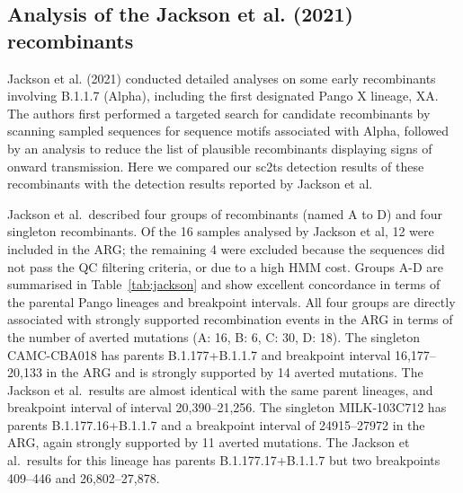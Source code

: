 \documentclass[12pt,letterpaper]{article}
\begin{document}
\subsection*{Analysis of the Jackson et al. (2021) recombinants}
Jackson et al. (2021) conducted detailed analyses on some early recombinants
involving B.1.1.7 (Alpha), including the first designated Pango X lineage, XA.
The authors first performed a targeted search for candidate recombinants by
scanning sampled sequences for sequence motifs associated with Alpha, followed
by an analysis to reduce the list of plausible recombinants displaying signs of
onward transmission. Here we compared our sc2ts detection results of these
recombinants with the detection results reported by Jackson et al.

Jackson et al.\ described four groups of recombinants (named A to D) and
four singleton recombinants.
Of the 16 samples analysed by Jackson et al, 12 were included in the ARG;
the remaining 4 were excluded because the sequences did not pass the 
QC filtering criteria, or due to a high HMM cost. Groups A-D are summarised 
in Table~\ref{tab:jackson} and show excellent concordance in terms 
of the parental Pango lineages and breakpoint intervals. All four groups
are directly associated with strongly supported recombination events 
in the ARG in terms of the number of averted mutations 
(A: 16, B: 6, C: 30, D: 18). 
The singleton CAMC-CBA018 has parents
B.1.177+B.1.1.7 and breakpoint interval 16,177--20,133 
in the ARG 
and is strongly supported by 14 averted mutations.
The Jackson et al.\ results are almost identical with the same parent 
lineages, and breakpoint interval of interval 20,390--21,256.
The singleton MILK-103C712 
has parents B.1.177.16+B.1.1.7 and a breakpoint interval of 
24915--27972 
in the ARG, again strongly supported by 11 averted mutations.
The Jackson et al.\ results for this lineage 
has parents B.1.177.17+B.1.1.7 but two breakpoints
409--446 and 26,802--27,878.
\end{document}
